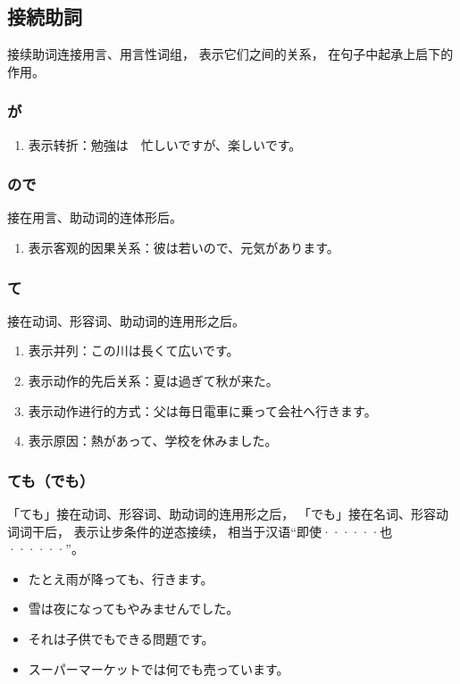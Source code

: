 \subsection{接続助詞}%

接续助词连接用言、用言性词组，
表示它们之间的关系，
在句子中起承上启下的作用。


\subsubsection{が}%

\begin{enumerate}
  \item 表示转折：勉強は　忙しいですが、楽しいです。
\end{enumerate}


\subsubsection{ので}%

接在用言、助动词的连体形后。
\begin{enumerate}
  \item 表示客观的因果关系：彼は若いので、元気があります。
\end{enumerate}


\subsubsection{て}%

接在动词、形容词、助动词的连用形之后。
\begin{enumerate}
  \item 表示并列：この川は長くて広いです。
  \item 表示动作的先后关系：夏は過ぎて秋が来た。
  \item 表示动作进行的方式：父は毎日電車に乗って会社へ行きます。
  \item 表示原因：熱があって、学校を休みました。
\end{enumerate}


\subsubsection{ても（でも）}%

「ても」接在动词、形容词、助动词的连用形之后，
「でも」接在名词、形容动词词干后，
表示让步条件的逆态接续，
相当于汉语``即使······也······''。
\begin{itemize}
  \item たとえ雨が降っても、行きます。
  \item 雪は夜になってもやみませんでした。
  \item それは子供でもできる問題です。
  \item スーパーマーケットでは何でも売っています。
\end{itemize}


